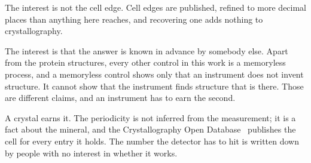 The interest is not the cell edge. Cell edges are published, refined to more decimal places than anything here reaches, and recovering one adds nothing to crystallography.

The interest is that the answer is known in advance by somebody else. Apart from the protein structures, every other control in this work is a memoryless process, and a memoryless control shows only that an instrument does not invent structure. It cannot show that the instrument finds structure that is there. Those are different claims, and an instrument has to earn the second.

A crystal earns it. The periodicity is not inferred from the measurement; it is a fact about the mineral, and the Crystallography Open Database~\cite{src:Crystallography-Open-Database} publishes the cell for every entry it holds. The number the detector has to hit is written down by people with no interest in whether it works.
